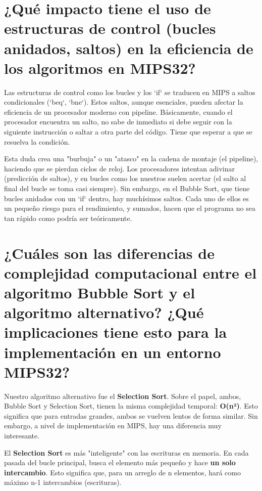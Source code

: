 \documentclass{article}
\begin{document}
\section{¿Qué impacto tiene el uso de estructuras de control (bucles anidados, saltos) en la eficiencia de los algoritmos en MIPS32?}
\indent\indent Las estructuras de control como los bucles y los `if` se traducen en MIPS a saltos condicionales (`beq`, `bne`). Estos saltos, aunque esenciales, pueden afectar la eficiencia de un procesador moderno con pipeline. Básicamente, cuando el procesador encuentra un salto, no sabe de inmediato si debe seguir con la siguiente instrucción o saltar a otra parte del código. Tiene que esperar a que se resuelva la condición.\newline

\noindent Esta duda crea una "burbuja" o un "atasco" en la cadena de montaje (el pipeline), haciendo que se pierdan ciclos de reloj. Los procesadores intentan adivinar (predicción de saltos), y en bucles como los nuestros suelen acertar (el salto al final del bucle se toma casi siempre). Sin embargo, en el Bubble Sort, que tiene bucles anidados con un `if` dentro, hay muchísimos saltos. Cada uno de ellos es un pequeño riesgo para el rendimiento, y sumados, hacen que el programa no sea tan rápido como podría ser teóricamente.

\newpage

\section{¿Cuáles son las diferencias de complejidad computacional entre el algoritmo Bubble Sort y el algoritmo alternativo? ¿Qué implicaciones tiene esto para la implementación en un entorno MIPS32?}
\indent\indent Nuestro algoritmo alternativo fue el \textbf{Selection Sort}. Sobre el papel, ambos, Bubble Sort y Selection Sort, tienen la misma complejidad temporal: \textbf{O(n²)}. Esto significa que para entradas grandes, ambos se vuelven lentos de forma similar. Sin embargo, a nivel de implementación en MIPS, hay una diferencia muy interesante.\newline

\noindent El \textbf{Selection Sort} es más "inteligente" con las escrituras en memoria. En cada pasada del bucle principal, busca el elemento más pequeño y hace \textbf{un solo intercambio}. Esto significa que, para un arreglo de n elementos, hará como máximo n-1 intercambios (escrituras).\newline
\end{document}
